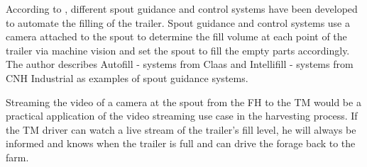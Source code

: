 According to \textcite{murcia_quadrotor_2014}, different spout guidance and control systems have been developed to automate the filling of the trailer. Spout guidance and control systems use a camera attached to the spout to determine the fill volume at each point of the trailer via machine vision and set the spout to fill the empty parts accordingly. The author describes Autofill - systems from Claas and Intellifill - systems from CNH Industrial as examples of spout guidance systems.

Streaming the video of a camera at the spout from the \ac{FH} to the \ac{TM} would be a practical application of the video streaming use case in the harvesting process. If the \ac{TM} driver can watch a live stream of the trailer's fill level, he will always be
informed and knows when the trailer is full and can drive the forage back to the
farm.

